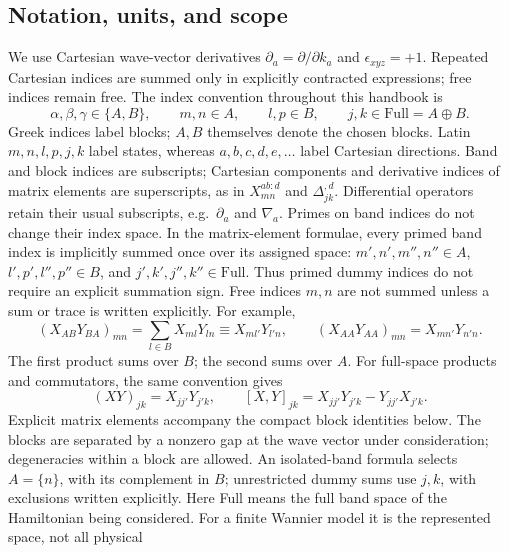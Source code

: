 \documentclass[prx,amsmath,amssymb,superscriptaddress,longbibliography]{revtex4-2}
\begin{document}
\subsection{Notation, units, and scope}
\label{sec:notation}
We use Cartesian wave-vector derivatives
$\partial_a=\partial/\partial k_a$ and $\epsilon_{xyz}=+1$.
Repeated Cartesian indices are summed only in explicitly contracted expressions;
free indices remain free. The index convention throughout this handbook is
\begin{equation}
 \alpha,\beta,\gamma\in\{A,B\},\qquad
 m,n\in A,\qquad l,p\in B,\qquad
 j,k\in\mathrm{Full}=A\oplus B.
 \label{eq:index-spaces}
\end{equation}
Greek indices label blocks; $A,B$ themselves denote the chosen blocks.
Latin $m,n,l,p,j,k$ label states, whereas $a,b,c,d,e,\ldots$ label
Cartesian directions. Band and block indices are subscripts; Cartesian
components and derivative indices of matrix elements are superscripts,
as in $X_{mn}^{ab:d}$ and $\Delta_{jk}^{,d}$.
Differential operators retain their usual subscripts, e.g.\ $\partial_a$
and $\nabla_a$. Primes on band indices do not change their index space.
In the matrix-element formulae, every primed band index is implicitly summed
once over its assigned space:
$m',n',m'',n''\in A$, $l',p',l'',p''\in B$, and
$j',k',j'',k''\in\mathrm{Full}$.
Thus primed dummy indices do not require an explicit summation sign.
Free indices $m,n$ are not summed unless a sum or trace is written explicitly.
For example,
\begin{equation}
 (X_{AB}Y_{BA})_{mn}
 =\sum_{l\in B}X_{ml}Y_{ln}\equiv X_{ml'}Y_{l'n},\qquad
 (X_{AA}Y_{AA})_{mn}=X_{mn'}Y_{n'n}.
 \label{eq:component-sums}
\end{equation}
The first product sums over $B$; the second sums over $A$.
For full-space products and commutators, the same convention gives
\begin{equation}
 (XY)_{jk}=X_{jj'}Y_{j'k},\qquad
 [X,Y]_{jk}=X_{jj'}Y_{j'k}-Y_{jj'}X_{j'k}.
 \label{eq:full-product-components}
\end{equation}
Explicit matrix elements accompany the compact block identities below.
The blocks are separated by a nonzero gap at the wave vector under
consideration; degeneracies within a block are allowed.
An isolated-band formula selects $A=\{n\}$, with its complement in $B$;
unrestricted dummy sums use $j,k$, with exclusions written explicitly.
Here Full means the full band space of the Hamiltonian being considered.
For a finite Wannier model it is the represented space, not all physical
\end{document}
